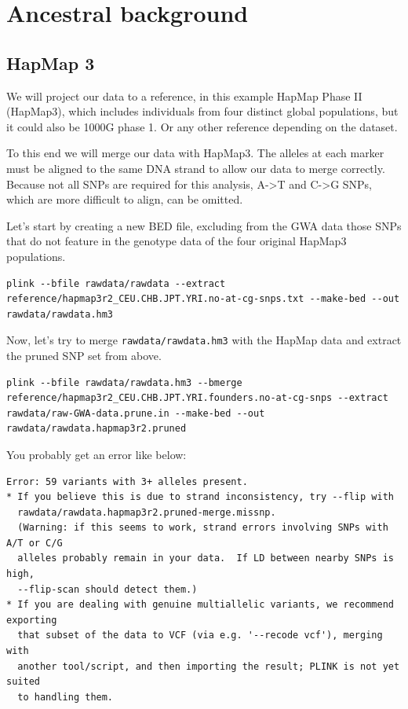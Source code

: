 \documentclass[
]{book}
\begin{document}
\hypertarget{ancestral-background}{%
\section{Ancestral background}\label{ancestral-background}}

\hypertarget{hapmap-3}{%
\subsection{HapMap 3}\label{hapmap-3}}

We will project our data to a reference, in this example HapMap Phase II (HapMap3), which includes individuals from four distinct global populations, but it could also be 1000G phase 1. Or any other reference depending on the dataset.

To this end we will merge our data with HapMap3. The alleles at each marker must be aligned to the same DNA strand to allow our data to merge correctly. Because not all SNPs are required for this analysis, A-\textgreater T and C-\textgreater G SNPs, which are more difficult to align, can be omitted.

Let's start by creating a new BED file, excluding from the GWA data those SNPs that do not feature in the genotype data of the four original HapMap3 populations.

\begin{verbatim}
plink --bfile rawdata/rawdata --extract reference/hapmap3r2_CEU.CHB.JPT.YRI.no-at-cg-snps.txt --make-bed --out rawdata/rawdata.hm3
\end{verbatim}

Now, let's try to merge \texttt{rawdata/rawdata.hm3} with the HapMap data and extract the pruned SNP set from above.

\begin{verbatim}
plink --bfile rawdata/rawdata.hm3 --bmerge reference/hapmap3r2_CEU.CHB.JPT.YRI.founders.no-at-cg-snps --extract rawdata/raw-GWA-data.prune.in --make-bed --out rawdata/rawdata.hapmap3r2.pruned
\end{verbatim}

You probably get an error like below:

\begin{verbatim}
Error: 59 variants with 3+ alleles present.
* If you believe this is due to strand inconsistency, try --flip with
  rawdata/rawdata.hapmap3r2.pruned-merge.missnp.
  (Warning: if this seems to work, strand errors involving SNPs with A/T or C/G
  alleles probably remain in your data.  If LD between nearby SNPs is high,
  --flip-scan should detect them.)
* If you are dealing with genuine multiallelic variants, we recommend exporting
  that subset of the data to VCF (via e.g. '--recode vcf'), merging with
  another tool/script, and then importing the result; PLINK is not yet suited
  to handling them.
\end{verbatim}
\end{document}
